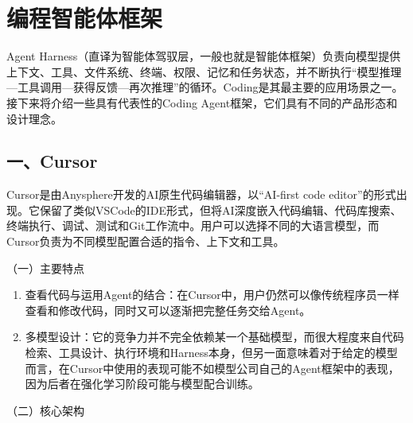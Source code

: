 \setcounter{section}{4}

\hypertarget{ux7f16ux7a0bux667aux80fdux4f53ux6846ux67b6}{%
\section{编程智能体框架}\label{ux7f16ux7a0bux667aux80fdux4f53ux6846ux67b6}}

Agent Harness（直译为智能体驾驭层，一般也就是智能体框架）负责向模型提供上下文、工具、文件系统、终端、权限、记忆和任务状态，并不断执行``模型推理---工具调用---获得反馈---再次推理''的循环。Coding是其最主要的应用场景之一。接下来将介绍一些具有代表性的Coding Agent框架，它们具有不同的产品形态和设计理念。

\hypertarget{ux4e00cursor}{%
\subsection{一、Cursor}\label{ux4e00cursor}}

Cursor是由Anysphere开发的AI原生代码编辑器，以``AI-first code editor''的形式出现。它保留了类似VSCode的IDE形式，但将AI深度嵌入代码编辑、代码库搜索、终端执行、调试、测试和Git工作流中。用户可以选择不同的大语言模型，而Cursor负责为不同模型配置合适的指令、上下文和工具。

（一）主要特点

\begin{enumerate}
\def\labelenumi{\arabic{enumi}.}
\item
  查看代码与运用Agent的结合：在Cursor中，用户仍然可以像传统程序员一样查看和修改代码，同时又可以逐渐把完整任务交给Agent。
\item
  多模型设计：它的竞争力并不完全依赖某一个基础模型，而很大程度来自代码检索、工具设计、执行环境和Harness本身，但另一面意味着对于给定的模型而言，在Cursor中使用的表现可能不如模型公司自己的Agent框架中的表现，因为后者在强化学习阶段可能与模型配合训练。
\end{enumerate}

（二）核心架构

